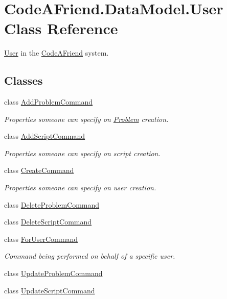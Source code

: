 \hypertarget{class_code_a_friend_1_1_data_model_1_1_user}{}\section{Code\+A\+Friend.\+Data\+Model.\+User Class Reference}
\label{class_code_a_friend_1_1_data_model_1_1_user}


\mbox{\hyperlink{class_code_a_friend_1_1_data_model_1_1_user}{User}} in the \mbox{\hyperlink{namespace_code_a_friend}{Code\+A\+Friend}} system. 


\subsection*{Classes}
\begin{DoxyCompactItemize}
\item 
class \mbox{\hyperlink{class_code_a_friend_1_1_data_model_1_1_user_1_1_add_problem_command}{Add\+Problem\+Command}}
\begin{DoxyCompactList}\small\item\em Properties someone can specify on \mbox{\hyperlink{class_code_a_friend_1_1_data_model_1_1_problem}{Problem}} creation.\end{DoxyCompactList}\item 
class \mbox{\hyperlink{class_code_a_friend_1_1_data_model_1_1_user_1_1_add_script_command}{Add\+Script\+Command}}
\begin{DoxyCompactList}\small\item\em Properties someone can specify on script creation.\end{DoxyCompactList}\item 
class \mbox{\hyperlink{class_code_a_friend_1_1_data_model_1_1_user_1_1_create_command}{Create\+Command}}
\begin{DoxyCompactList}\small\item\em Properties someone can specify on user creation.\end{DoxyCompactList}\item 
class \mbox{\hyperlink{class_code_a_friend_1_1_data_model_1_1_user_1_1_delete_problem_command}{Delete\+Problem\+Command}}
\item 
class \mbox{\hyperlink{class_code_a_friend_1_1_data_model_1_1_user_1_1_delete_script_command}{Delete\+Script\+Command}}
\item 
class \mbox{\hyperlink{class_code_a_friend_1_1_data_model_1_1_user_1_1_for_user_command}{For\+User\+Command}}
\begin{DoxyCompactList}\small\item\em Command being performed on behalf of a specific user.\end{DoxyCompactList}\item 
class \mbox{\hyperlink{class_code_a_friend_1_1_data_model_1_1_user_1_1_update_problem_command}{Update\+Problem\+Command}}
\item 
class \mbox{\hyperlink{class_code_a_friend_1_1_data_model_1_1_user_1_1_update_script_command}{Update\+Script\+Command}}
\end{DoxyCompactItemize}
